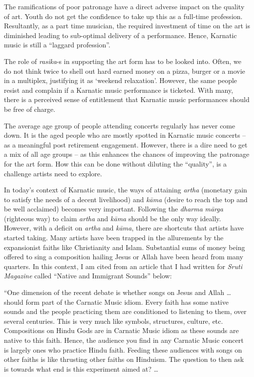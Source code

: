 \newpage

The ramifications of poor patronage have a direct adverse impact on the quality of art. Youth do not get the confidence to take up this as a full-time profession. Resultantly, as a part time musician, the required investment of time on the art is diminished leading to sub-optimal delivery of a performance. Hence, Karnatic music is still a “laggard profession”.

The role of \textit{rasika}-s in supporting the art form has to be looked into. Often, we do not think twice to shell out hard earned money on a pizza, burger or a movie in a multiplex, justifying it as ‘weekend relaxation'. However, the same people resist and complain if a Karnatic music performance is ticketed. With many, there is a perceived sense of entitlement that Karnatic music performances should be free of charge.

The average age group of people attending concerts regularly has never come down. It is the aged people who are mostly spotted in Karnatic music concerts – as a meaningful post retirement engagement. However, there is a dire need to get a mix of all age groups – as this enhances the chances of improving the patronage for the art form. How this can be done without diluting the “quality”, is a challenge artists need to explore.

In today’s context of Karnatic music, the ways of attaining \textit{artha} (monetary gain to satisfy the needs of a decent livelihood) and \textit{kāma} (desire to reach the top and be well acclaimed) becomes very important. Following the \textit{dharma} \textit{mārga} (righteous way) to claim \textit{artha} and \textit{kāma} should be the only way ideally. However, with a deficit on \textit{artha} and \textit{kāma}, there are shortcuts that artists have started taking. Many artists have been trapped in the allurements by the expansionist faiths like Christianity and Islam. Substantial sums of money being offered to sing a composition hailing Jesus or Allah have been heard from many quarters. In this context, I am cited from an article that I had written for \textit{Sruti Magazine} called “Native and Immigrant Sounds” below:

\begin{myquote}
“One dimension of the recent debate is whether songs on Jesus and Allah … should form part of the Carnatic Music idiom. Every faith has some native sounds and the people practicing them are conditioned to listening to them, over several centuries. This is very much like symbols, structures, culture, etc. Compositions on Hindu Gods are in Carnatic Music idiom as these sounds are native to this faith. Hence, the audience you find in any Carnatic Music concert is largely ones who practice Hindu faith. Feeding these audiences with songs on other faiths is like thrusting other faiths on Hinduism. The question to then ask is towards what end is this experiment aimed at? …
\end{myquote}

